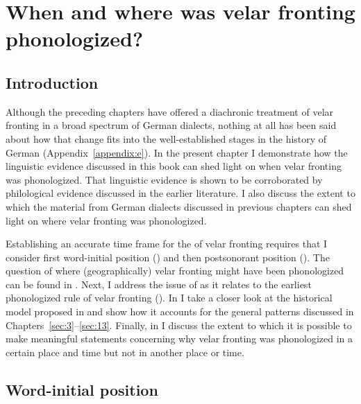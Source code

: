 \chapter{When and where was velar fronting phonologized?}\label{sec:16}

\section{Introduction}\label{sec:16.1}

Although the preceding chapters have offered a diachronic treatment of velar fronting in a broad spectrum of German dialects, nothing at all has been said about how that change fits into the well-established stages in the history of German (Appendix~\ref{appendix:e}). In the present chapter I demonstrate how the linguistic evidence discussed in this book can shed light on when velar fronting was phonologized. That linguistic evidence is shown to be corroborated by philological evidence discussed in the earlier literature. I also discuss the extent to which the material from German dialects discussed in previous chapters can shed light on where velar fronting was phonologized.\largerpage

Establishing an accurate time frame for the  of velar fronting requires that I consider first word-initial position () and then postsonorant position (). The question of where (geographically) velar fronting might have been phonologized can be found in . Next, I address the issue of  as it relates to the earliest phonologized rule of velar fronting (). In  I take a closer look at the historical model proposed in  and show how it accounts for the general patterns discussed in Chapters~\ref{sec:3}–\ref{sec:13}. Finally, in  I discuss the extent to which it is possible to make meaningful statements concerning why velar fronting was phonologized in a certain place and time but not in another place or time.

\section{{Word-initial} {position}}\label{sec:16.2}

